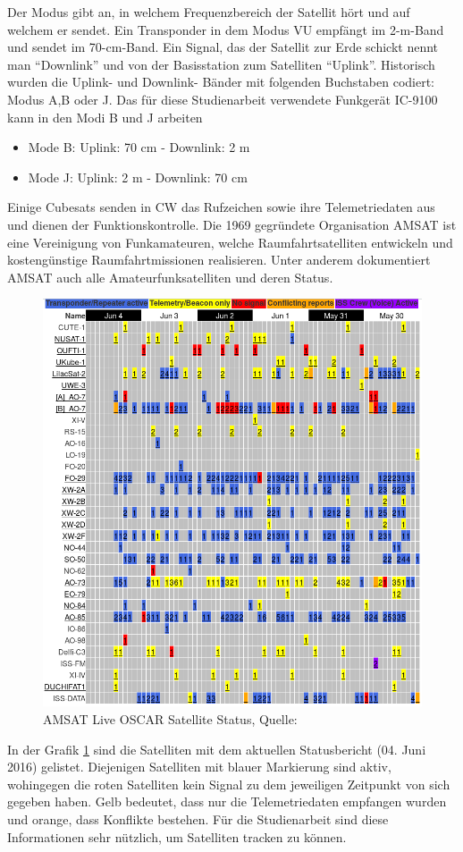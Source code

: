 \clearpage
Der Modus gibt an, in welchem Frequenzbereich der Satellit hört und auf welchem er sendet. Ein Transponder in dem 
Modus VU empfängt im 2-m-Band und sendet im 70-cm-Band. Ein Signal, das der Satellit zur Erde schickt nennt man ``Downlink'' und von der Basisstation 
zum Satelliten ``Uplink''.
Historisch wurden die Uplink- und Downlink- Bänder mit folgenden Buchstaben codiert: Modus A,B oder J.
Das für diese Studienarbeit verwendete Funkgerät IC-9100 kann in den Modi B und J arbeiten \cite[S.153]{radiomanual}
\begin{itemize}
 \item Mode B: Uplink: 70 cm - Downlink:  2  m 
 \item Mode J: Uplink:  2  m - Downlink: 70 cm
\end{itemize}
Einige Cubesats senden in \ac{CW} das Rufzeichen sowie ihre Telemetriedaten aus und dienen der Funktionskontrolle.
\newpar
Die 1969 gegründete Organisation AMSAT ist eine Vereinigung von Funkamateuren, welche Raumfahrtsatelliten entwickeln und kostengünstige 
Raumfahrtmissionen realisieren. Unter anderem dokumentiert AMSAT auch alle Amateurfunksatelliten und deren Status. \\
\begin{figure}[h]
 \centering
 \includegraphics[width=0.65\linewidth]{./images/amsatlist}
 \caption{AMSAT Live OSCAR Satellite Status, Quelle: \cite{amsat}}
 \label{fig:amsat}
\end{figure}
\clearpage
In der Grafik \ref{fig:amsat} sind die Satelliten mit dem aktuellen Statusbericht (04. Juni 2016) gelistet. Diejenigen Satelliten mit blauer 
Markierung sind aktiv, wohingegen die roten Satelliten kein Signal zu dem jeweiligen Zeitpunkt von sich gegeben haben. Gelb bedeutet, dass nur die 
Telemetriedaten empfangen wurden und orange, dass Konflikte bestehen. Für die Studienarbeit sind diese Informationen sehr nützlich, um Satelliten 
tracken zu können. 